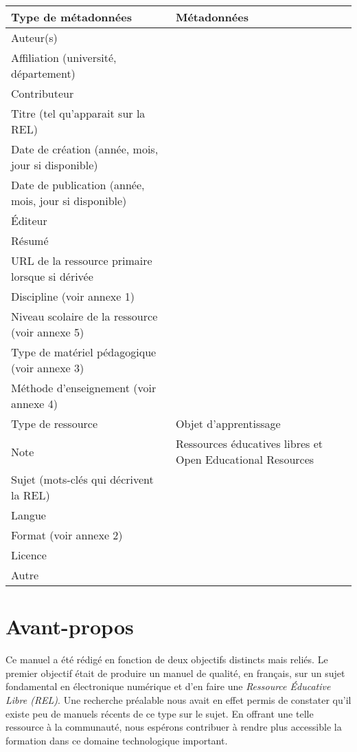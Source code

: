 \documentclass[11pt]{article}
\begin{document}
\begin{center}
\begin{tabular}{ll}
\textbf{Type de métadonnées} & \textbf{Métadonnées}\\
\hline
Auteur(s) & \\
Affiliation (université, département) & \\
Contributeur & \\
Titre (tel qu'apparait sur la REL) & \\
Date de création (année, mois, jour si disponible) & \\
Date de publication (année, mois, jour si disponible) & \\
Éditeur & \\
Résumé & \\
URL de la ressource primaire lorsque si dérivée & \\
Discipline (voir annexe 1) & \\
Niveau scolaire de la ressource (voir annexe 5) & \\
Type de matériel pédagogique (voir annexe 3) & \\
Méthode d'enseignement (voir annexe 4) & \\
Type de ressource & Objet d'apprentissage\\
Note & Ressources éducatives libres et Open Educational Resources\\
Sujet (mots-clés qui décrivent la REL) & \\
Langue & \\
Format (voir annexe 2) & \\
Licence & \\
Autre & \\
\end{tabular}
\end{center}

\section*{Avant-propos}
\label{sec:org3cbc780}
Ce manuel a été rédigé en fonction de deux objectifs distincts mais
reliés. Le premier objectif était de produire un manuel de qualité, en
français, sur un sujet fondamental en électronique numérique et d'en
faire une \emph{Ressource Éducative Libre (REL)}. Une recherche préalable
nous avait en effet permis de constater qu'il existe peu de manuels
récents de ce type sur le sujet. En offrant une telle ressource à la
communauté, nous espérons contribuer à rendre plus accessible la
formation dans ce domaine technologique important.
\end{document}
